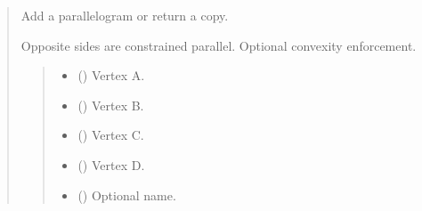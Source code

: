 \documentclass[letterpaper,10pt,english]{sphinxmanual}
\begin{document}
\begin{quote}
\begin{fulllineitems}
\begin{fulllineitems}
\label{\detokenize{pygeox:pygeox.add_objects.AddNamespace.parallelogram}}
\pysigstartsignatures
\pysiglinewithargsret
{}
{\sphinxparamcomma {}\sphinxparamcomma {}\sphinxparamcomma {}\sphinxparamcomma {}\sphinxparamcomma {}\sphinxparamcomma {}}
{}
\pysigstopsignatures
\sphinxAtStartPar
Add a parallelogram or return a copy.

\sphinxAtStartPar
Opposite sides are constrained parallel. Optional convexity enforcement.
\begin{quote}\begin{description}
\begin{itemize}
\item {} 
\sphinxAtStartPar
{} (\sphinxstyleliteralemphasis{\sphinxupquote{ | }}) \textendash{} Vertex A.

\item {} 
\sphinxAtStartPar
{} (\sphinxstyleliteralemphasis{\sphinxupquote{ | }}) \textendash{} Vertex B.

\item {} 
\sphinxAtStartPar
{} (\sphinxstyleliteralemphasis{\sphinxupquote{ | }}) \textendash{} Vertex C.

\item {} 
\sphinxAtStartPar
{} (\sphinxstyleliteralemphasis{\sphinxupquote{ | }}) \textendash{} Vertex D.

\item {} 
\sphinxAtStartPar
{} (\sphinxstyleliteralemphasis{\sphinxupquote{ | }}) \textendash{} Optional name.


\end{itemize}
\end{description}
\end{quote}
\end{fulllineitems}
\end{fulllineitems}
\end{quote}
\end{document}
